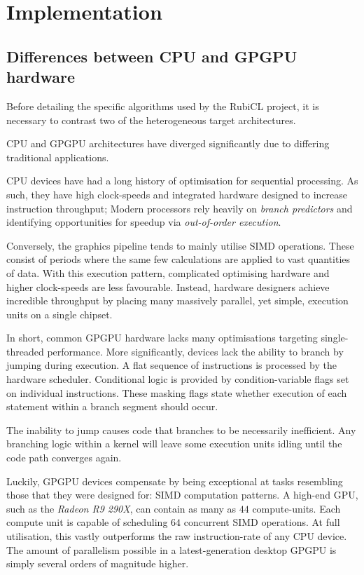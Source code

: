 \chapter{Implementation}
\section{Differences between CPU and GPGPU hardware}
Before detailing the specific algorithms  used by the RubiCL project, it is necessary to contrast two of the heterogeneous target architectures.

\ac{CPU} and \ac{GPGPU} architectures have diverged significantly due to differing traditional applications.

\ac{CPU} devices have had a long history of optimisation for sequential processing. As such, they have high clock-speeds and integrated hardware designed to increase instruction throughput; Modern processors rely heavily on \emph{branch predictors} and identifying opportunities for speedup via \emph{out-of-order execution}.

Conversely, the graphics pipeline tends to mainly utilise \ac{SIMD} operations. These consist of periods where the same few calculations are applied to vast quantities of data. With this execution pattern, complicated optimising hardware and higher clock-speeds are less favourable. Instead, hardware designers achieve incredible throughput by placing many massively parallel, yet simple, execution units on a single chipset.

In short, common \ac{GPGPU} hardware lacks many optimisations targeting single-threaded performance. More significantly, devices lack the ability to branch by jumping during execution. A flat sequence of instructions is processed by the hardware scheduler. Conditional logic is provided by condition-variable flags set on individual instructions. These masking flags state whether execution of each statement within a branch segment should occur.

The inability to jump causes code that branches to be necessarily inefficient. Any branching logic within a kernel will leave some execution units idling until the code path converges again.

Luckily, \ac{GPGPU} devices compensate by being exceptional at tasks resembling those that they were designed for: \ac{SIMD} computation patterns. A high-end \ac{GPU}, such as the \emph{Radeon R9 290X}, can contain as many as $44$ compute-units. Each compute unit is capable of scheduling $64$ concurrent \ac{SIMD} operations. At full utilisation, this vastly outperforms the raw instruction-rate of any \ac{CPU} device. The amount of parallelism possible in a latest-generation desktop \ac{GPGPU} is simply several orders of magnitude higher.

